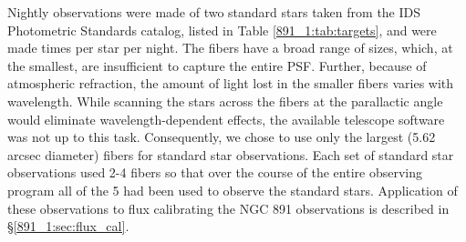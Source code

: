 Nightly observations were made of two standard stars taken from the
IDS Photometric Standards catalog, listed in Table \ref{891_1:tab:targets},
and were made  times per star per night. The \GP fibers have a
broad range of sizes, which, at the smallest, are insufficient to
capture the entire PSF. Further, because of atmospheric refraction,
the amount of light lost in the smaller fibers varies with wavelength.
While scanning the stars across the fibers at the parallactic
angle would eliminate wavelength-dependent effects, the available
telescope software was not up to this task. Consequently, we chose to
use only the largest (5.62 arcsec diameter) fibers for standard star
observations. Each set of standard star observations used 2-4 fibers
so that over the course of the entire observing program all of the
5 had been used to observe the standard stars. Application of
these observations to flux calibrating the NGC 891 observations is
described in \S\ref{891_1:sec:flux_cal}.




